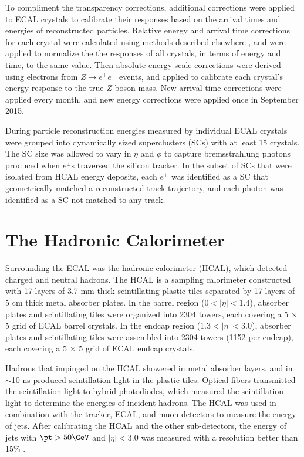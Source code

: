 To compliment the transparency corrections, additional corrections were applied to ECAL crystals 
to calibrate their responses based on the arrival times and energies of reconstructed particles.  Relative energy 
and arrival time corrections for each crystal were calculated using methods described elsewhere \cite{eGammaMonitCalib2011}, and 
were applied to normalize the the responses of all crystals, in terms of energy and time, to the same value.  Then 
absolute energy scale corrections were derived using electrons from $Z \rightarrow e^{+}e^{-}$ events, and applied 
to calibrate each crystal's energy response to the true $Z$ boson mass.  New arrival time corrections were applied 
every month, and new energy corrections were applied once in September 2015.

During particle reconstruction energies measured by individual ECAL crystals were grouped into dynamically 
sized superclusters (SCs) with at least 15 crystals.  The SC size was allowed to vary in $\eta$ and $\phi$ to capture 
bremsstrahlung photons produced when $e^{\pm}$s traversed the silicon tracker.  In the subset of SCs that were isolated 
from HCAL energy deposits, each $e^{\pm}$ was identified as a SC that geometrically matched a reconstructed track 
trajectory, and each photon was identified as a SC not matched to any track.


\section{The Hadronic Calorimeter}
\label{sec:hcalDescription}
Surrounding the ECAL was the hadronic calorimeter (HCAL), which detected charged and neutral hadrons.  The 
HCAL is a sampling calorimeter constructed with 17 layers of 3.7 mm thick scintillating plastic tiles separated by 
17 layers of 5 cm thick metal absorber plates.  In the barrel 
region ($0 < |\eta| < 1.4$), absorber plates and scintillating tiles were organized into 2304 towers, each 
covering a 5 $\times$ 5 grid of ECAL barrel crystals.  In the endcap region ($1.3 < |\eta| < 3.0$), absorber 
plates and scintillating tiles were assembled into 2304 towers (1152 per endcap), each covering 
a 5 $\times$ 5 grid of ECAL endcap crystals.

Hadrons that impinged on the HCAL showered in metal absorber layers, and in $\sim$10 ns produced scintillation 
light in the plastic tiles.  Optical fibers transmitted the scintillation light to hybrid photodiodes, 
which measured the scintillation light to determine the energies of incident hadrons.  The HCAL was used in 
combination with the tracker, ECAL, and muon detectors to measure the energy of jets.  After calibrating the 
HCAL and the other sub-detectors, the energy of jets with $\pt > 50\GeV$ and $|\eta| < 3.0$ was measured with 
a resolution better than 15\% \cite{jetResolutionInCollisions}.

